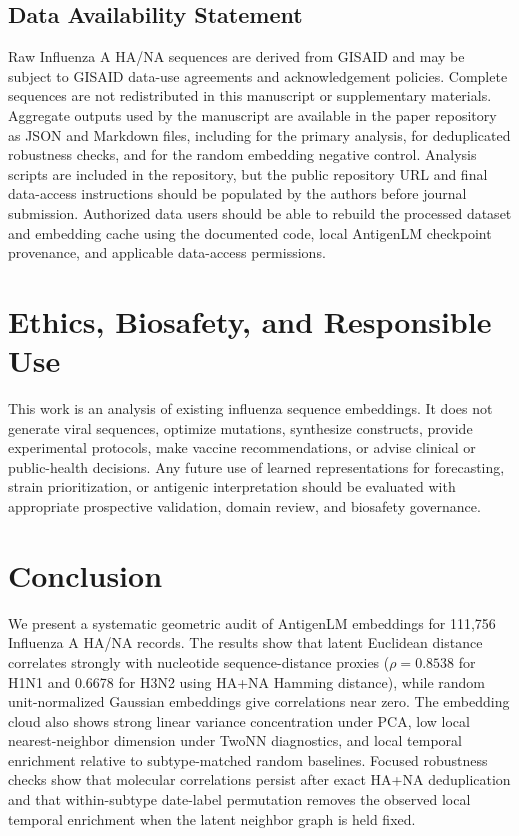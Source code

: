\documentclass[11pt]{article}
\begin{document}
\subsection*{Data Availability Statement}

Raw Influenza A HA/NA sequences are derived from GISAID \cite{shu2017gisaid} and may be subject to GISAID data-use agreements and acknowledgement policies. Complete sequences are not redistributed in this manuscript or supplementary materials. Aggregate outputs used by the manuscript are available in the paper repository as JSON and Markdown files, including  for the primary analysis,  for deduplicated robustness checks, and  for the random embedding negative control. Analysis scripts are included in the repository, but the public repository URL and final data-access instructions should be populated by the authors before journal submission. Authorized data users should be able to rebuild the processed dataset and embedding cache using the documented code, local AntigenLM checkpoint provenance, and applicable data-access permissions.

\section{Ethics, Biosafety, and Responsible Use}

This work is an analysis of existing influenza sequence embeddings. It does not generate viral sequences, optimize mutations, synthesize constructs, provide experimental protocols, make vaccine recommendations, or advise clinical or public-health decisions. Any future use of learned representations for forecasting, strain prioritization, or antigenic interpretation should be evaluated with appropriate prospective validation, domain review, and biosafety governance.

\section{Conclusion}

We present a systematic geometric audit of AntigenLM embeddings for 111,756 Influenza A HA/NA records. The results show that latent Euclidean distance correlates strongly with nucleotide sequence-distance proxies ($\rho=0.8538$ for H1N1 and 0.6678 for H3N2 using HA+NA Hamming distance), while random unit-normalized Gaussian embeddings give correlations near zero. The embedding cloud also shows strong linear variance concentration under PCA, low local nearest-neighbor dimension under TwoNN diagnostics, and local temporal enrichment relative to subtype-matched random baselines. Focused robustness checks show that molecular correlations persist after exact HA+NA deduplication and that within-subtype date-label permutation removes the observed local temporal enrichment when the latent neighbor graph is held fixed.
\end{document}

